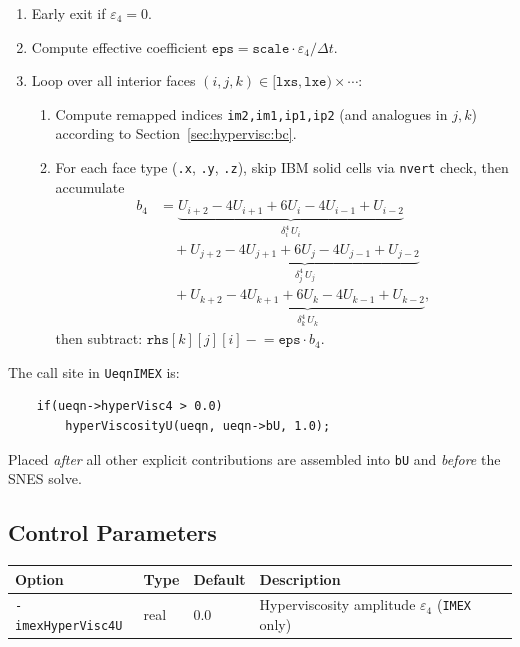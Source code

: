 \documentclass[12pt,a4paper]{article}
\newcommand{\dt}{\Delta t}
\begin{document}
	\begin{enumerate}
		\item Early exit if $\varepsilon_4 = 0$.
		\item Compute effective coefficient
		$\texttt{eps} = \texttt{scale}\cdot \varepsilon_4 / \dt$.
		\item Loop over all interior faces
		$(i,j,k)\in[\texttt{lxs},\texttt{lxe})\times\cdots$:
		\begin{enumerate}
			\item Compute remapped indices \texttt{im2,im1,ip1,ip2}
			(and analogues in $j,k$) according to
			Section~\ref{sec:hypervisc:bc}.
			\item For each face type (\texttt{.x}, \texttt{.y}, \texttt{.z}),
			skip IBM solid cells via \texttt{nvert} check, then accumulate
			\begin{align*}
				b_4 &=
				\underbrace{U_{i+2} - 4U_{i+1} + 6U_i - 4U_{i-1} + U_{i-2}}_{
					\delta^4_i\, U_i}\\
				&\quad
				+\underbrace{U_{j+2} - 4U_{j+1} + 6U_j - 4U_{j-1} + U_{j-2}}_{
					\delta^4_j\, U_j}\\
				&\quad
				+\underbrace{U_{k+2} - 4U_{k+1} + 6U_k - 4U_{k-1} + U_{k-2}}_{
					\delta^4_k\, U_k},
			\end{align*}
			then subtract: $\texttt{rhs}[k][j][i] \mathrel{-}= \texttt{eps}\cdot b_4$.
		\end{enumerate}
	\end{enumerate}

	The call site in \texttt{UeqnIMEX} is:
	\begin{lstlisting}
	if(ueqn->hyperVisc4 > 0.0)
	    hyperViscosityU(ueqn, ueqn->bU, 1.0);
	\end{lstlisting}
	Placed \emph{after} all other explicit contributions are assembled
	into \texttt{bU} and \emph{before} the SNES solve.

	\subsection{Control Parameters}

	\begin{center}
		\begin{tabular}{llll}
			\toprule
			Option & Type & Default & Description \\
			\midrule
			\texttt{-imexHyperVisc4U} & real & 0.0 & Hyperviscosity amplitude $\varepsilon_4$
			(\texttt{IMEX} only) \\
			\bottomrule
		\end{tabular}
	\end{center}
\end{document}
